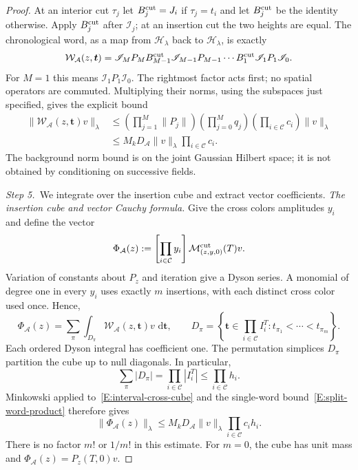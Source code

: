 \documentclass[12pt,oneside,openany]{book}
\numberwithin{equation}{section}
\theoremstyle{nogostyle}
\theoremstyle{definition}
\newcommand{\ud}{\,\mathrm{d}}
\begin{document}
\begin{proof}
  At an interior cut $\tau_j$ let $B_j^{\rm cut} = J_i$ if $\tau_j = t_i$ and
  let $B_j^{\rm cut}$ be the identity otherwise. Apply $B_j^{\rm cut}$ after
  $\mathscr{I}_j$; at an insertion cut the two heights are equal. The
  chronological word, as a map from $\mathcal{H}_\lambda$ back to
  $\mathcal{H}_\lambda$, is exactly
  \[
    \mathcal{W}_{\mathcal{A}}(z,\boldsymbol t)
    =\mathscr{I}_M P_M B_{M-1}^{\rm cut}\mathscr{I}_{M-1}P_{M-1}
    \cdots B_1^{\rm cut}\mathscr{I}_1P_1\mathscr{I}_0.
  \]
  For $M = 1$ this means $\mathscr{I}_1P_1\mathscr{I}_0$. The rightmost factor
  acts first; no spatial operators are commuted. Multiplying their norms, using
  the subspaces just specified, gives the explicit bound
  \begin{equation}\label{E:split-word-product}
    \begin{split}
      \|\mathcal{W}_{\mathcal{A}}(z,\boldsymbol t)v\|_\lambda
      &\le\left(\prod_{j=1}^M\|P_j\|\right)
      \left(\prod_{j=0}^M q_j\right)
      \left(\prod_{i\in\mathcal{C}}c_i\right)\|v\|_\lambda\\
      &\le M_kD_{\mathcal{A}}\|v\|_\lambda
      \prod_{i\in\mathcal{C}}c_i.
    \end{split}
  \end{equation}
  The background norm bound is on the joint Gaussian Hilbert space; it is not
  obtained by conditioning on successive fields.


  \medskip
  \noindent\textit{Step 5.~}We integrate over the insertion cube and extract
  vector coefficients.
  \emph{The insertion cube and vector Cauchy formula.} Give the cross colors
  amplitudes $y_i$ and define the vector
  \[
    \Phi_{\mathcal{A}}(z)
    :=\left[\prod_{i\in\mathcal{C}}y_i\right]
    \mathcal{M}^{\rm cut}_{(z,y,0)}(T)v.
  \]
  Variation of constants about $P_z$ and iteration give a Dyson series. A
  monomial of degree one in every $y_i$ uses exactly $m$ insertions, with each
  distinct cross color used once. Hence,
  \begin{equation}\label{E:interval-cross-cube}
    \Phi_{\mathcal{A}}(z)
    =\sum_{\pi}\int_{D_\pi}
    \mathcal{W}_{\mathcal{A}}(z,\boldsymbol t)v\,\ud\boldsymbol t,
    \qquad
    D_\pi=\left\{\boldsymbol t\in\prod_{i\in\mathcal{C}}I_i^T:
    t_{\pi_1}<\cdots<t_{\pi_m}\right\}.
  \end{equation}
  Each ordered Dyson integral has coefficient one. The permutation simplices
  $D_\pi$ partition the cube up to null diagonals. In particular,
  \[
    \sum_\pi |D_\pi|=\prod_{i\in\mathcal{C}}|I_i^T|
    \le\prod_{i\in\mathcal{C}}h_i.
  \]
  Minkowski applied to~\eqref{E:interval-cross-cube} and the single-word
  bound~\eqref{E:split-word-product} therefore gives
  \begin{equation}\label{E:interval-cross-vector}
    \|\Phi_{\mathcal{A}}(z)\|_\lambda
    \le M_kD_{\mathcal{A}}\|v\|_\lambda
    \prod_{i\in\mathcal{C}}c_i h_i.
  \end{equation}
  There is no factor $m!$ or $1/m!$ in this estimate. For $m = 0$, the cube has
  unit mass and $\Phi_{\mathcal{A}}(z) = P_z(T,0)v$.


\end{proof}
\end{document}
